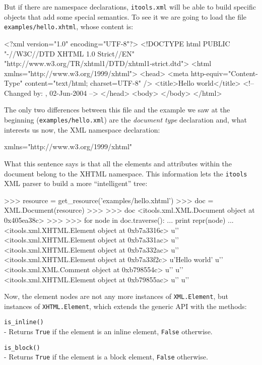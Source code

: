 But if there are namespace declarations, {\tt itools.xml} will be able to
build specific objects that add some special semantics. To see it we are
going to load the file {\tt examples/hello.xhtml}, whose content is:

\begin{code}
    <?xml version="1.0" encoding="UTF-8"?>
    <!DOCTYPE html PUBLIC "-//W3C//DTD XHTML 1.0 Strict//EN"
           "http://www.w3.org/TR/xhtml1/DTD/xhtml1-strict.dtd">
    <html xmlns="http://www.w3.org/1999/xhtml">
      <head>
        <meta http-equiv="Content-Type" content="text/html; charset=UTF-8" />
        <title>Hello world</title>
        <!-- Changed by: , 02-Jun-2004 -->
      </head>
      <body>
      </body>
    </html>
\end{code}

The only two differences between this file and the example we saw at the
beginning ({\tt examples/hello.xml}) are the {\em document type} declaration
and, what interests us now, the XML namespace declaration:

\begin{code}
    xmlns="http://www.w3.org/1999/xhtml"
\end{code}

What this sentence says is that all the elements and attributes within the
document belong to the XHTML namespace. This information lets the {\tt itools}
XML parser to build a more ``intelligent'' tree:

\begin{code}
    >>> resource = get_resource('examples/hello.xhtml')
    >>> doc = XML.Document(resource)
    >>> 
    >>> doc
    <itools.xml.XML.Document object at 0x405ea38c>
    >>> 
    >>> for node in doc.traverse():
    ...     print repr(node)
    ... 
    <itools.xml.XHTML.Element object at 0xb7a3316c>
    u'\n  '
    <itools.xml.XHTML.Element object at 0xb7a331ac>
    u'\n    '
    <itools.xml.XHTML.Element object at 0xb7a332ac>
    u'\n    '
    <itools.xml.XHTML.Element object at 0xb7a33f2c>
    u'Hello world'
    u'\n    '
    <itools.xml.XML.Comment object at 0xb798554c>
    u'\n  '
    u'\n  '
    <itools.xml.XHTML.Element object at 0xb79855ac>
    u'\n  '
    u'\n'
\end{code}

Now, the element nodes are not any more instances of {\tt XML.Element}, but
instances of {\tt XHTML.Element}, which extends the generic API with the
methods:

\begin{api}
    {\tt is\_inline()}\\
    - Returns {\tt True} if the element is an inline element, {\tt False}
    otherwise.

    {\tt is\_block()}\\
    - Returns {\tt True} if the element is a block element, {\tt False}
    otherwise.
\end{api}


